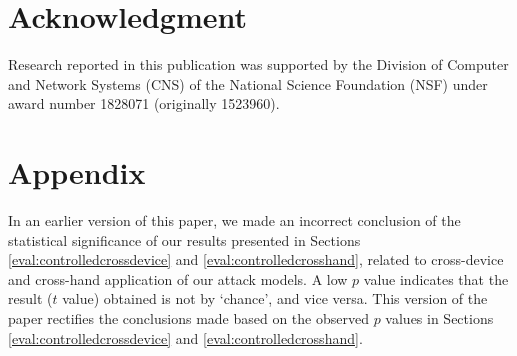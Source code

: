 \documentclass[]{IEEEtran}
\begin{document}
\section*{Acknowledgment}
Research reported in this publication was supported by the Division of Computer and Network Systems (CNS) of the National Science Foundation (NSF) under award number 1828071 (originally 1523960).




\section*{Appendix}
In an earlier version of this paper, we made an incorrect conclusion of the statistical significance of our results presented in Sections \ref{eval:controlledcrossdevice} and \ref{eval:controlledcrosshand}, related to cross-device and cross-hand application of our attack models. A low $p$ value indicates that the result ($t$ value) obtained is not by `chance', and vice versa. This version of the paper rectifies the conclusions made based on the observed $p$ values in Sections \ref{eval:controlledcrossdevice} and \ref{eval:controlledcrosshand}.
\end{document}
